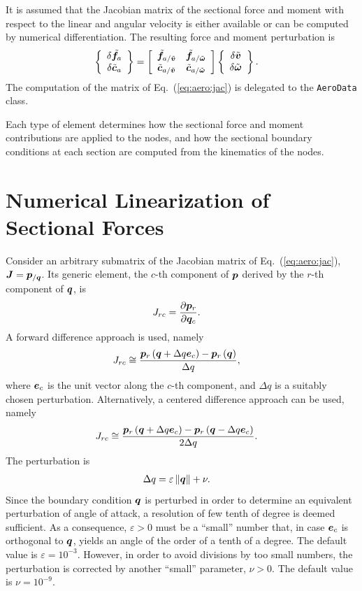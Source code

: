It is assumed that the Jacobian matrix of the sectional force and moment
with respect to the linear and angular velocity
is either available or can be computed by numerical differentiation.
The resulting force and moment perturbation is
\begin{align}
	\cubr{\cvvect{
		\delta\tilde{\T{f}}_a \\
		\delta\tilde{\T{c}}_a
	}} &= \sqbr{\matr{cc}{
		\tilde{\T{f}}_{a/\tilde{\T{v}}} & \tilde{\T{f}}_{a/\tilde{\T{\omega}}} \\
		\tilde{\T{c}}_{a/\tilde{\T{v}}} & \tilde{\T{c}}_{a/\tilde{\T{\omega}}}
	}} \cubr{\cvvect{
		\delta\tilde{\T{v}} \\
		\delta\tilde{\T{\omega}}
	}}
	\label{eq:aero:jac}
	.
\end{align}
The computation of the matrix of Eq.~(\ref{eq:aero:jac})
is delegated to the \texttt{AeroData} class.

Each type of element determines how the sectional force and moment
contributions are applied to the nodes, and how the sectional
boundary conditions at each section are computed from the kinematics
of the nodes.



\section{Numerical Linearization of Sectional Forces}
Consider an arbitrary submatrix of the Jacobian matrix
of Eq.~(\ref{eq:aero:jac}), $\TT{J}=\T{p}_{/\T{q}}$.
Its generic element, the $c$-th component of $\T{p}$
derived by the $r$-th component of $\T{q}$, is
\begin{align}
	J_{rc} &= \frac{\partial\T{p}_r}{\partial\T{q}_c}
	.
\end{align}
A forward difference approach is used, namely
\begin{align}
	J_{rc} &\cong \frac{
		\T{p}_r\plbr{\T{q} + \Delta q \T{e}_c}
		- \T{p}_r\plbr{\T{q}}
	}{
		\Delta q
	}
	,
\end{align}
where $\T{e}_c$ is the unit vector along the $c$-th component,
and $\Delta q$ is a suitably chosen perturbation.
Alternatively, a centered difference approach can be used, namely
\begin{align}
	J_{rc} &\cong \frac{
		\T{p}_r\plbr{\T{q} + \Delta q \T{e}_c}
		- \T{p}_r\plbr{\T{q} - \Delta q \T{e}_c}
	}{
		2 \Delta q
	}
	.
\end{align}
The perturbation is
\begin{align}
	\Delta q &= \varepsilon \nrbr{\T{q}} + \nu
	.
\end{align}
Since the boundary condition $\T{q}$ is perturbed in order to determine
an equivalent perturbation of angle of attack, a resolution of few tenth
of degree is deemed sufficient.
As a consequence, $\varepsilon>0$ must be a ``small'' number
that, in case $\T{e}_c$ is orthogonal to $\T{q}$,
yields an angle of the order of a tenth of a degree.
The default value is $\varepsilon=10^{-3}$.
However, in order to avoid divisions by too small numbers,
the perturbation is corrected by another ``small'' parameter,
$\nu>0$.
The default value is $\nu=10^{-9}$.




